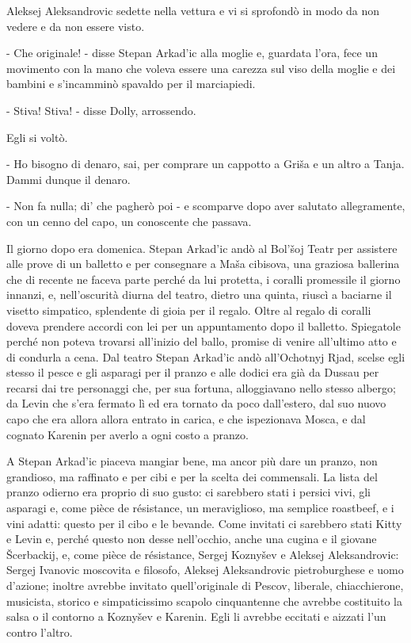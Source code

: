 Aleksej Aleksandrovic sedette nella vettura e vi si sprofondò in modo da non vedere e da non essere visto. 

- Che originale! - disse Stepan Arkad'ic alla moglie e, guardata l'ora, fece un movimento con la mano che voleva essere una carezza sul viso della moglie e dei bambini e s'incamminò spavaldo per il marciapiedi. 

- Stiva! Stiva! - disse Dolly, arrossendo. 

Egli si voltò. 

- Ho bisogno di denaro, sai, per comprare un cappotto a Griša e un altro a Tanja. Dammi dunque il denaro. 

- Non fa nulla; di' che pagherò poi - e scomparve dopo aver salutato allegramente, con un cenno del capo, un conoscente che passava. 

\label{vii-3} 

Il giorno dopo era domenica. Stepan Arkad'ic andò al Bol'šoj Teatr per assistere alle prove di un balletto e per consegnare a Maša cibisova, una graziosa ballerina che di recente ne faceva parte perché da lui protetta, i coralli promessile il giorno innanzi, e, nell'oscurità diurna del teatro, dietro una quinta, riuscì a baciarne il visetto simpatico, splendente di gioia per il regalo. Oltre al regalo di coralli doveva prendere accordi con lei per un appuntamento dopo il balletto. Spiegatole perché non poteva trovarsi all'inizio del ballo, promise di venire all'ultimo atto e di condurla a cena. Dal teatro Stepan Arkad'ic andò all'Ochotnyj Rjad, scelse egli stesso il pesce e gli asparagi per il pranzo e alle dodici era già da Dussau per recarsi dai tre personaggi che, per sua fortuna, alloggiavano nello stesso albergo; da Levin che s'era fermato lì ed era tornato da poco dall'estero, dal suo nuovo capo che era allora allora entrato in carica, e che ispezionava Mosca, e dal cognato Karenin per averlo a ogni costo a pranzo. 

A Stepan Arkad'ic piaceva mangiar bene, ma ancor più dare un pranzo, non grandioso, ma raffinato e per cibi e per la scelta dei commensali. La lista del pranzo odierno era proprio di suo gusto: ci sarebbero stati i persici vivi, gli asparagi e, come pièce de résistance, un meraviglioso, ma semplice roastbeef, e i vini adatti: questo per il cibo e le bevande. Come invitati ci sarebbero stati Kitty e Levin e, perché questo non desse nell'occhio, anche una cugina e il giovane Šcerbackij, e, come pièce de résistance, Sergej Koznyšev e Aleksej Aleksandrovic: Sergej Ivanovic moscovita e filosofo, Aleksej Aleksandrovic pietroburghese e uomo d'azione; inoltre avrebbe invitato quell'originale di Pescov, liberale, chiacchierone, musicista, storico e simpaticissimo scapolo cinquantenne che avrebbe costituito la salsa o il contorno a Koznyšev e Karenin. Egli li avrebbe eccitati e aizzati l'un contro l'altro. 

